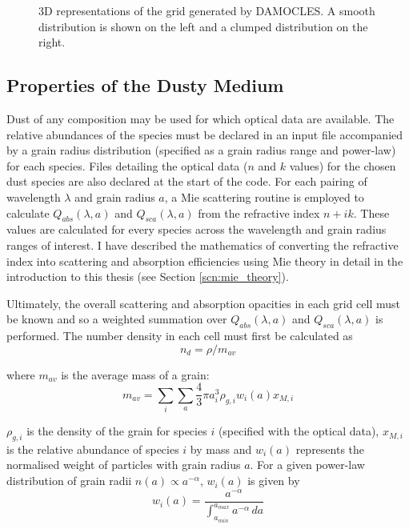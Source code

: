 \begin{figure}
\begin{subfigure}{0.4\textwidth}
\end{subfigure}
\caption{3D representations of the grid generated by DAMOCLES.  A smooth distribution is shown on the left and a clumped distribution on the right.}
\label{fig:grid}
\end{figure}


\subsection{Properties of the Dusty Medium}
\label{scn:grainsize}
Dust of any composition may be used for which optical data are available.  The relative abundances of the species must be declared in an input file accompanied by a grain radius distribution (specified as a grain radius range and power-law) for each species.  Files detailing the optical data ($n$ and $k$ values) for the chosen dust species are also declared at the start of the code.  For each pairing of wavelength $\lambda$ and grain radius $a$, a Mie scattering routine is employed to calculate $Q_{abs}(\lambda,a)$ and $Q_{sca}(\lambda,a)$ from the refractive index $n+ik$.  These values are calculated for every species across the wavelength and grain radius ranges of interest.  I have described the mathematics of converting the refractive index into scattering and absorption efficiencies using Mie theory in detail in the introduction to this thesis (see Section \ref{scn:mie_theory}).


Ultimately, the overall scattering and absorption opacities in each grid cell must be known and so a weighted summation over $Q_{abs}(\lambda,a)$ and $Q_{sca}(\lambda,a)$ is performed.  The number density in each cell must first be calculated as 
\begin{equation}
\label{eqn:density}
n_d = \rho/m_{av}
\end{equation}

\noindent where $m_{av}$ is the average mass of a grain: 
\begin{equation}
\label{eqn:Mav}
m_{av}=\sum_i \sum_a \frac{4}{3} \pi a_i^3 \rho_{g,i} w_i(a) x_{M,i}
\end{equation}

\noindent $\rho_{g,i}$ is the density of the grain for species $i$ (specified with the optical data), $x_{M,i}$ is the relative abundance of species $i$ by mass and $w_i(a)$ represents the normalised weight of particles with grain radius $a$.  For a given power-law distribution of grain radii $n(a) \propto a^{-\alpha}$,   $w_i(a)$ is given by
\begin{equation}
w_i(a)=\frac{a^{-\alpha}}{\int_{a_{min}}^{a_{max}} a^{-\alpha} \, da}
\end{equation}

